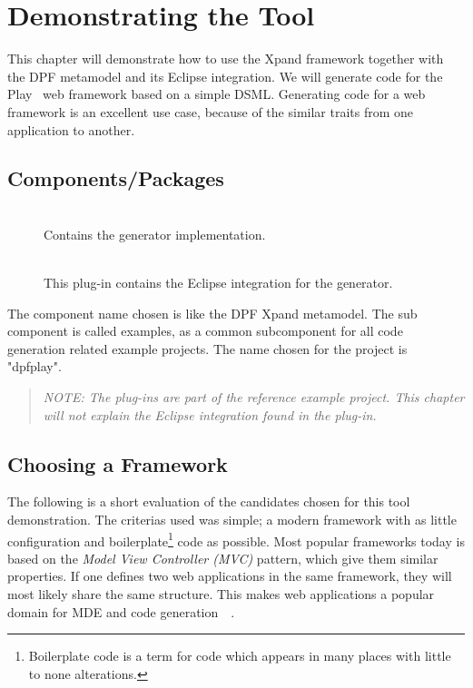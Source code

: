 \chapter{Demonstrating the Tool}\label{chap:case_study}
This chapter will demonstrate how to use the Xpand framework together with the DPF metamodel and its Eclipse integration. We will generate code for the Play~\cite{playframework} web framework based on a simple DSML. Generating code for a web framework is an excellent use case, because of the similar traits from one application to another. 

\section{Components/Packages}
\begin{description}
  \item[] \hfill \\
  Contains the generator implementation.
  \item[] \hfill \\
  This plug-in contains the Eclipse integration for the generator.
\end{description}

The component name chosen is  like the DPF Xpand metamodel. The sub component is called examples, as a common subcomponent for all code generation related example projects. The name chosen for the project is "dpfplay".
\begin{quote}
  \emph{NOTE: The plug-ins are part of the reference example project. This chapter will not explain the Eclipse integration found in the  plug-in.}
\end{quote}

\section{Choosing a Framework}
The following is a short evaluation of the candidates chosen for this tool demonstration. The criterias used was simple;
a modern framework with as little configuration and boilerplate\footnote{Boilerplate code is a term for code which appears in many places with little to none alterations.} code as possible.  Most popular frameworks today is based on the \emph{Model View Controller (MVC)} pattern, which give them similar properties. If one defines two web applications in the same framework, they will most likely share the same structure. This makes web applications a popular domain for MDE and code generation~\cite{Vis08}~\cite{uwe4jsf}. 

